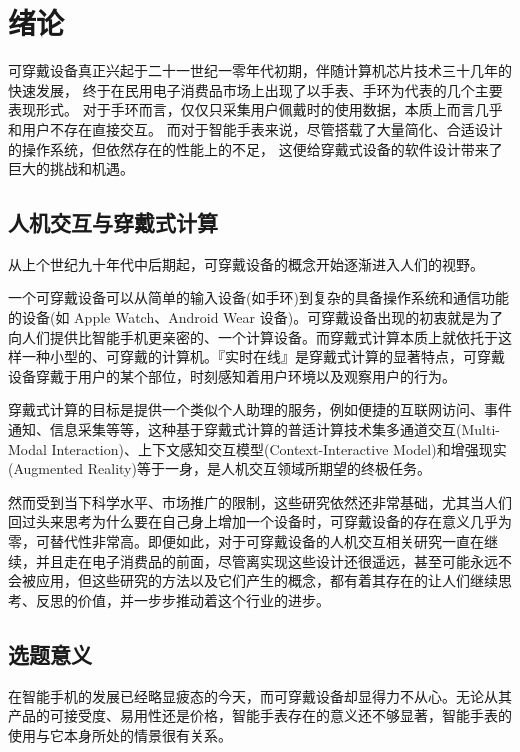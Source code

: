 \chapter{绪论}

可穿戴设备真正兴起于二十一世纪一零年代初期，伴随计算机芯片技术三十几年的快速发展，
终于在民用电子消费品市场上出现了以手表、手环为代表的几个主要表现形式。
对于手环而言，仅仅只采集用户佩戴时的使用数据，本质上而言几乎和用户不存在直接交互。
而对于智能手表来说，尽管搭载了大量简化、合适设计的操作系统，但依然存在的性能上的不足，
这便给穿戴式设备的软件设计带来了巨大的挑战和机遇\cite{DBLP:journals/corr/JiangCZZKZ15}。

\section{人机交互与穿戴式计算}

从上个世纪九十年代中后期起，可穿戴设备的概念开始逐渐进入人们的视野。

一个可穿戴设备可以从简单的输入设备(如手环)到复杂的具备操作系统和通信功能的设备(如 Apple Watch、Android Wear 设备)。可穿戴设备出现的初衷就是为了向人们提供比智能手机更亲密的、一个计算设备。而穿戴式计算本质上就依托于这样一种小型的、可穿戴的计算机。『实时在线』是穿戴式计算的显著特点，可穿戴设备穿戴于用户的某个部位，时刻感知着用户环境以及观察用户的行为。

穿戴式计算的目标是提供一个类似个人助理的服务，例如便捷的互联网访问、事件通知、信息采集等等，这种基于穿戴式计算的普适计算技术集多通道交互(Multi-Modal Interaction)、上下文感知交互模型(Context-Interactive Model)和增强现实(Augmented Reality)等于一身，是人机交互领域所期望的终极任务\cite{dongshihai2004,yuweining2004}。

然而受到当下科学水平、市场推广的限制，这些研究依然还非常基础，尤其当人们回过头来思考为什么要在自己身上增加一个设备时，可穿戴设备的存在意义几乎为零，可替代性非常高。即便如此，对于可穿戴设备的人机交互相关研究一直在继续，并且走在电子消费品的前面，尽管离实现这些设计还很遥远，甚至可能永远不会被应用，但这些研究的方法以及它们产生的概念，都有着其存在的让人们继续思考、反思的价值\cite{hudson2014concepts}，并一步步推动着这个行业的进步。

\section{选题意义}

在智能手机的发展已经略显疲态的今天，而可穿戴设备却显得力不从心。无论从其产品的可接受度、易用性还是价格，智能手表存在的意义还不够显著，智能手表的使用与它本身所处的情景很有关系\cite{zhuzijian2015}。

